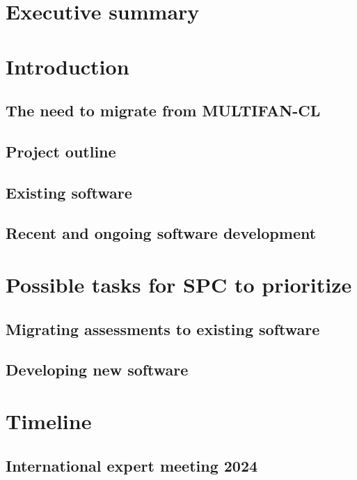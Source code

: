 \documentclass{SCreport}
\begin{document}
\wcpfctitlepage

\tableofcontents
\newpage

\section{Executive summary}

\section{Introduction}

\subsection{The need to migrate from MULTIFAN-CL}

\subsection{Project outline}

\subsection{Existing software}

\subsection{Recent and ongoing software development}

\section{Possible tasks for SPC to prioritize}

\subsection{Migrating assessments to existing software}

\subsection{Developing new software}

\section{Timeline}

\subsection{International expert meeting 2024}
\end{document}
